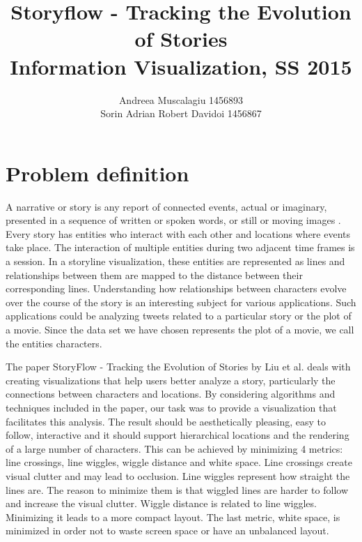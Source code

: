 \documentclass{report}
\begin{document}
\title{Storyflow - Tracking the Evolution of Stories\\
Information Visualization, SS 2015}
\author{Andreea Muscalagiu 1456893\\
Sorin Adrian Robert Davidoi		1456867}
\maketitle
\chapter{Problem definition}
\par
A narrative or story is any report of connected events, actual or imaginary, presented in a sequence of written or spoken words, or still or moving images \cite{Narrative}. Every story has entities who interact with each other and locations where events take place. The interaction of multiple entities during two adjacent time frames is a session. In a storyline visualization, these entities are represented as lines and relationships between them are mapped to the distance between their corresponding lines. Understanding how relationships between characters evolve over the course of the story is an interesting subject for various applications. Such applications could be analyzing tweets related to a particular story or the plot of a movie. Since the data set we have chosen represents the plot of a movie, we call the entities characters.

\par The paper StoryFlow - Tracking the Evolution of Stories by Liu et al. deals with creating visualizations that help users better analyze a story, particularly the connections between characters and locations. \cite{liu} By considering algorithms and techniques included in the paper, our task was to provide a visualization that facilitates this analysis. The result should be aesthetically pleasing, easy to follow, interactive and it should support hierarchical locations and the rendering of a large number of characters. This can be achieved by minimizing 4 metrics: line crossings, line wiggles, wiggle distance and white space. Line crossings create visual clutter and may lead to occlusion. Line wiggles represent how straight the lines are. The reason to minimize them is that wiggled lines are harder to follow and increase the visual clutter. Wiggle distance is related to line wiggles. Minimizing it leads to a more compact layout. The last metric, white space, is minimized in order not to waste screen space or have an unbalanced layout.
\end{document}
